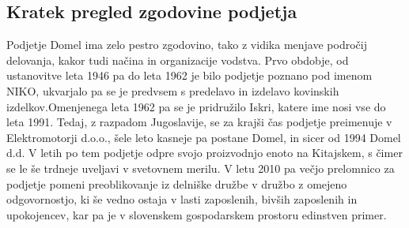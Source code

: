\documentclass[12pt,a4paper]{amsart}
\theoremstyle{definition} %
\theoremstyle{plain} %
\begin{document}
\subsection{Kratek pregled zgodovine podjetja}
Podjetje Domel ima zelo pestro zgodovino, tako z vidika menjave področij delovanja, kakor tudi načina in organizacije vodstva. Prvo obdobje, od ustanovitve leta 1946 pa do leta 1962 je bilo podjetje poznano pod imenom NIKO, ukvarjalo pa se je predvsem s predelavo in izdelavo kovinskih izdelkov.Omenjenega leta 1962 pa se je pridružilo Iskri, katere ime nosi vse do leta 1991. Tedaj, z razpadom Jugoslavije, se za krajši čas podjetje preimenuje v Elektromotorji d.o.o., šele leto kasneje pa postane Domel, in sicer od 1994 Domel d.d. V letih po tem podjetje odpre svojo proizvodnjo enoto na Kitajskem, s čimer se le še trdneje uveljavi v svetovnem merilu. V letu 2010 pa večjo prelomnico za podjetje pomeni preoblikovanje iz delniške družbe v družbo z omejeno odgovornostjo, ki še vedno ostaja v lasti zaposlenih, bivših zaposlenih in upokojencev, kar pa je v slovenskem gospodarskem prostoru edinstven primer.
\end{document}
